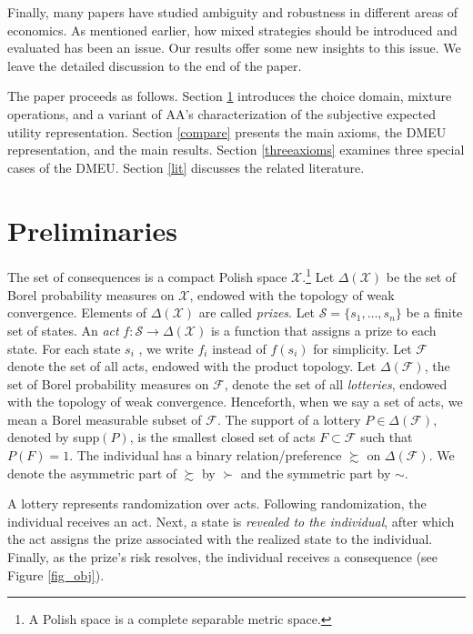 \documentclass[12pt, notitlepage]{article}
\begin{document}
Finally, many papers have studied ambiguity and robustness in different
areas of economics. As mentioned earlier, how mixed strategies should be
introduced and evaluated has been an issue. Our results offer some new
insights to this issue. We leave the detailed discussion to the end of the
paper.

The paper proceeds as follows. Section \ref{mainsection} introduces the
choice domain, mixture operations, and a variant of AA's characterization of
the subjective expected utility representation. Section \ref{compare}
presents the main axioms, the DMEU representation, and the main results.
Section \ref{threeaxioms} examines three special cases of the DMEU. Section %
\ref{lit} discusses the related literature.

\section{Preliminaries}

\label{mainsection}The set of consequences is a compact Polish space $%
\mathcal{X}$.\footnote{%
A Polish space is a complete separable metric space.} Let $\Delta (\mathcal{X%
})$ be the set of Borel probability measures on $\mathcal{X}$, endowed with
the topology of weak convergence. Elements of $\Delta (\mathcal{X})$ are
called \textit{prizes}. Let $\mathcal{S}=\{s_{1},\dots ,s_{n}\}$ be a finite
set of states. An \textit{act} $f:\mathcal{S}\rightarrow \Delta (\mathcal{X}%
) $ is a function that assigns a prize to each state. For each state $s_{i}$%
, we write $f_{i}$ instead of $f(s_{i})$ for simplicity. Let $\mathcal{F}$
denote the set of all acts, endowed with the product topology. Let $\Delta (%
\mathcal{F})$, the set of Borel probability measures on $\mathcal{F}$,
denote the set of all \textit{lotteries}, endowed with the topology of weak
convergence. Henceforth, when we say a set of acts, we mean a Borel
measurable subset of $\mathcal{F}$. The support of a lottery $P\in \Delta (%
\mathcal{F})$, denoted by supp$(P)$, is the smallest closed set of acts $%
F\subset \mathcal{F}$ such that $P(F)=1$. The individual has a binary
relation/preference $\succsim $ on $\Delta (\mathcal{F})$. We denote the
asymmetric part of $\succsim $ by $\succ $ and the symmetric part by $\sim $.

A lottery represents randomization over acts. Following randomization, the
individual receives an act. Next, a state is \textit{revealed to the
individual}, after which the act assigns the prize associated with the
realized state to the individual. Finally, as the prize's risk resolves, the
individual receives a consequence (see Figure \ref{fig_obj}).
\end{document}
